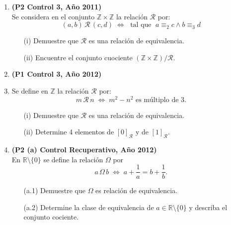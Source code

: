 \documentclass[10pt]{article}
\newcommand{\R}{\mathbb R}
\newcommand{\Z}{\mathbb Z}
\theoremstyle{plain}
\newcommand{\cur}[1]{\mathcal{#1}}
\theoremstyle{definition}
\begin{document}
\begin{enumerate}[label=\textbf{P\arabic*.-}]
\item \textbf{(P2 Control 3, Año 2011)}\\
Se considera en el conjunto $\Z\times\Z$ la relación $\cur{R}$ por:
$$(a,b)\,\cur{R}\,(c,d) \; \Leftrightarrow \; \mbox{ tal que } \; a\equiv_2 c \wedge b\equiv_3 d$$
\begin{enumerate}
\item[(i)] Demuestre que $\cur{R}$ es una relación de equivalencia.
\item[(ii)] Encuentre el conjunto cuociente $(\Z\times\Z)/\cur{R}$.
\end{enumerate}

\item \textbf{(P1 Control 3, Año 2012)}
\item Se define en $\Z$ la relación $\cur{R}$ por:
$$m\,\cur{R}\,n \; \Leftrightarrow \; m^2-n^2 \mbox{ es múltiplo de } 3.$$
\begin{enumerate}
\item[(i)] Demuestre que $\cur{R}$ es una relación de equivalencia.
\item[(ii)] Determine 4 elementos de $[0]_{\cur{R}}$ y de $[1]_{\cur{R}}$.
\end{enumerate}

\item \textbf{(P2 (a) Control Recuperativo, Año 2012)}\\
En $\R\setminus\{0\}$ se define la relación $\Omega$ por
$$a\,\Omega\,b\;\Longleftrightarrow \; a+\frac{1}{a}=b+\frac{1}{b}.$$
\begin{enumerate}
\item[(a.1)] Demuestre que $\Omega$ es relación de equivalencia.
\item[(a.2)] Determine la clase de equivalencia de $a\in\R\setminus\{0\}$ y describa el conjunto cociente.
\end{enumerate}


\end{enumerate}
\end{document}
